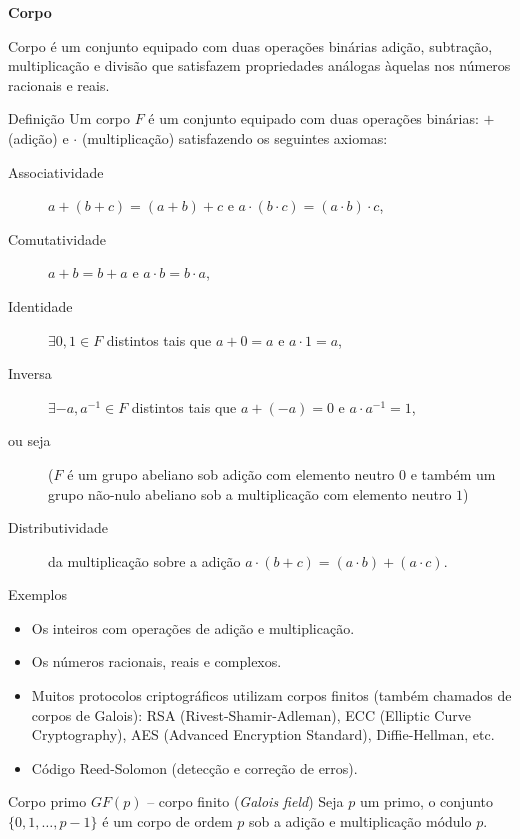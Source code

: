 \documentclass[portuguese,aspectratio=169]{beamer}
\begin{document}
\begin{frame}[allowframebreaks]
\framebreak
\textbf{Corpo}

Corpo é um conjunto equipado com duas operações binárias adição, subtração, multiplicação e divisão que satisfazem propriedades análogas àquelas nos números racionais e reais.

\framebreak
\begin{block}{Definição}
Um corpo $F$ é um conjunto equipado com duas operações binárias: $+$ (adição) e $\cdot$ (multiplicação) satisfazendo os seguintes axiomas:
  \begin{description}
    \item[Associatividade] $a + (b + c) = (a + b) + c$ e $a \cdot (b \cdot c) = (a \cdot b) \cdot c$,
    \item[Comutatividade] $a + b = b + a$ e $a \cdot b = b \cdot a$,
    \item[Identidade] $\exists 0, 1 \in F$ distintos tais que $a + 0 = a$ e $a \cdot 1 = a$,
    \item[Inversa] $\exists -a, a^{-1} \in F$ distintos tais que $a + (-a) = 0$ e $a \cdot a^{-1} = 1$,
    \item[ou seja] ($F$ é um grupo abeliano sob adição com elemento neutro $0$ e também um grupo não-nulo abeliano sob a multiplicação com elemento neutro $1$)
    \item[Distributividade] da multiplicação sobre a adição $a \cdot (b + c) = (a \cdot b) + (a \cdot c)$.
  \end{description}
\end{block}

\framebreak
\begin{block}{Exemplos}
  \begin{itemize}
    \item Os inteiros com operações de adição e multiplicação.
    \item Os números racionais, reais e complexos.
    \item Muitos protocolos criptográficos utilizam corpos finitos (também chamados de corpos de Galois): RSA (Rivest-Shamir-Adleman), ECC (Elliptic Curve Cryptography), AES (Advanced Encryption Standard), Diffie-Hellman, etc.
    \item Código Reed-Solomon (detecção e correção de erros).
  \end{itemize}
\end{block}

\framebreak
\begin{block}{Corpo primo $GF(p)$ -- corpo finito (\emph{Galois field})}
  Seja $p$ um primo, o conjunto $\{0,1,\ldots,p-1\}$ é um corpo de ordem $p$ sob a
  adição e multiplicação módulo $p$.
\end{block}


\end{frame}
\end{document}
